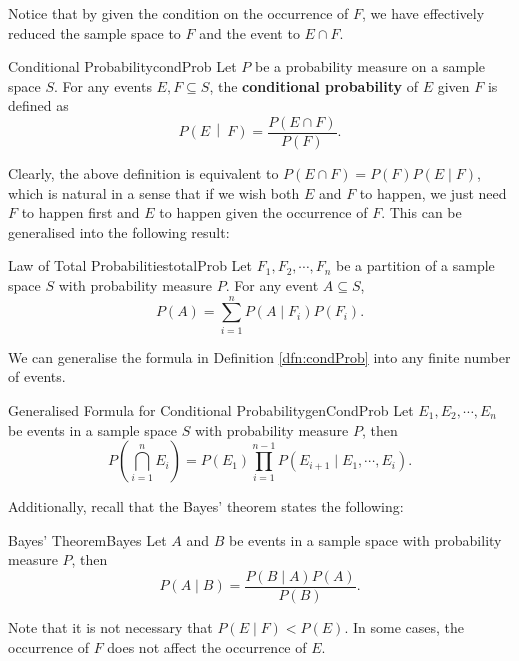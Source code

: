 \documentclass[math, code]{amznotes}
\theoremstyle{remark}
\begin{document}
Notice that by given the condition on the occurrence of $F$, we have effectively reduced the sample space to $F$ and the event to $E \cap F$.
\begin{dfnbox}{Conditional Probability}{condProb}
    Let $P$ be a probability measure on a sample space $S$. For any events $E, F \subseteq S$, the {\color{red} \textbf{conditional probability}} of $E$ given $F$ is defined as 
    \begin{equation*}
        P\left(E \,\middle\vert\ F\right) = \frac{P\left(E \cap F\right)}{P\left(F\right)}.
    \end{equation*}
\end{dfnbox}
Clearly, the above definition is equivalent to $P\left(E \cap F\right) = P\left(F\right)P\left(E \mid F\right)$, which is natural in a sense that if we wish both $E$ and $F$ to happen, we just need $F$ to happen first and $E$ to happen given the occurrence of $F$. This can be generalised into the following result:
\begin{thmbox}{Law of Total Probabilities}{totalProb}
    Let $F_1, F_2, \cdots, F_n$ be a partition of a sample space $S$ with probability measure $P$. For any event $A \subseteq S$, 
    \begin{equation*}
        P\left(A\right) = \sum_{i = 1}^{n}P\left(A \mid F_i\right)P\left(F_i\right).
    \end{equation*}
\end{thmbox}
We can generalise the formula in Definition \ref{dfn:condProb} into any finite number of events.
\begin{probox}{Generalised Formula for Conditional Probability}{genCondProb}
    Let $E_1, E_2, \cdots, E_n$ be events in a sample space $S$ with probability measure $P$, then 
    \begin{equation*}
        P\left(\bigcap_{i = 1}^nE_i\right) = P\left(E_1\right)\prod_{i = 1}^{n - 1}P\left(E_{i + 1} \mid E_1, \cdots, E_i\right).
    \end{equation*}
\end{probox}
Additionally, recall that the Bayes' theorem states the following:
\begin{thmbox}{Bayes' Theorem}{Bayes}
    Let $A$ and $B$ be events in a sample space with probability measure $P$, then 
    \begin{equation*}
        P\left(A \mid B\right) = \frac{P\left(B \mid A\right)P\left(A\right)}{P\left(B\right)}.
    \end{equation*}
\end{thmbox}
Note that it is not necessary that $P\left(E \mid F\right) < P\left(E\right)$. In some cases, the occurrence of $F$ does not affect the occurrence of $E$.
\end{document}
